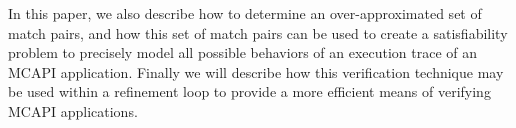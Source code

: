 In this paper, we also describe how to determine an over-approximated set of match pairs, and how this
set of match pairs can be used to create a satisfiability problem to precisely
model all possible behaviors of an execution trace of an MCAPI application.
Finally we will describe how this verification technique may be used within a
refinement loop to provide a more efficient means of verifying MCAPI
applications.








